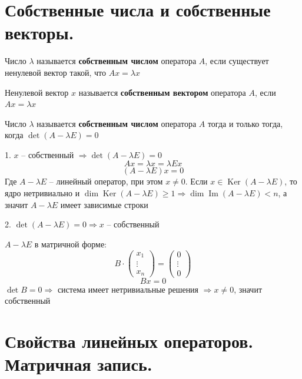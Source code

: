 \documentclass[14pt]{extreport}
\DeclareMathOperator{\Ima}{Im}
\DeclareMathOperator{\Ker}{Ker}
\begin{document}
    \chapter{Собственные числа и собственные векторы.}
    \begin{defbox}
        Число $\lambda$ называется \textbf{собственным числом} оператора $A$, если существует ненулевой вектор такой, что $Ax = \lambda x$
    \end{defbox}
    \begin{defbox}
        Ненулевой вектор $x$ называется \textbf{собственным вектором} оператора $A$, если $Ax = \lambda x$
    \end{defbox}
    \begin{thbox}
        Число $\lambda$ называется \textbf{собственным числом} оператора $A$ тогда и только тогда, когда $\det(A - \lambda E) = 0$
    \end{thbox}
    \begin{prbox}
        1. $x$ -- собственный $\Rightarrow \det (A - \lambda E) = 0$ 
        $$
        Ax = \lambda x = \lambda E x
        $$
        $$
        (A - \lambda E )x = 0
        $$
        Где $A - \lambda E$ -- линейный оператор, при этом $x \ne 0$. Если $x \in \Ker (A - \lambda E)$, то ядро нетривиально и $\dim \Ker(A - \lambda E) \ge 1 \Rightarrow \dim \Ima(A - \lambda E) < n$, а значит $A - \lambda E$ имеет зависимые строки
        
        \vspace{10pt}
        2. $\det (A - \lambda E) = 0 \Rightarrow x$ -- собственный

        $A - \lambda E$ в матричной форме: 
        $$
        B \cdot \begin{pmatrix}
            x_1\\
            \vdots\\
            x_n
        \end{pmatrix} = \begin{pmatrix}
            0\\
            \vdots\\
            0
        \end{pmatrix}
        $$
        $$
        Bx = 0
        $$
        $\det B = 0 \Rightarrow$ система имеет нетривиальные решения $\Rightarrow x \ne 0$, значит собственный
    \end{prbox} 

    \chapter{Свойства линейных операторов. Матричная запись.}
\end{document}
